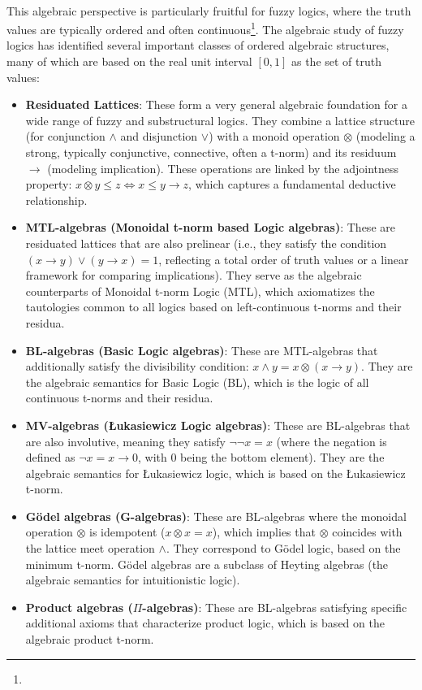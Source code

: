 \\


This algebraic perspective is particularly fruitful for fuzzy logics, where the truth values are typically ordered and often continuous\footnote{}. The algebraic study of fuzzy logics has identified several important classes of ordered algebraic structures, many of which are based on the real unit interval $[0,1]$ as the set of truth values:
\begin{itemize}
    \item \textbf{Residuated Lattices}: These form a very general algebraic foundation for a wide range of fuzzy and substructural logics. They combine a lattice structure (for conjunction $\wedge$ and disjunction $\vee$) with a monoid operation $\otimes$ (modeling a strong, typically conjunctive, connective, often a t-norm) and its residuum $\rightarrow$ (modeling implication). These operations are linked by the adjointness property: $x \otimes y \leq z \iff x \leq y \rightarrow z$, which captures a fundamental deductive relationship.
    \item \textbf{MTL-algebras (Monoidal t-norm based Logic algebras)}: These are residuated lattices that are also prelinear (i.e., they satisfy the condition $(x \rightarrow y) \vee (y \rightarrow x) = 1$, reflecting a total order of truth values or a linear framework for comparing implications). They serve as the algebraic counterparts of Monoidal t-norm Logic (MTL), which axiomatizes the tautologies common to all logics based on left-continuous t-norms and their residua.
    \item \textbf{BL-algebras (Basic Logic algebras)}: These are MTL-algebras that additionally satisfy the divisibility condition: $x \wedge y = x \otimes (x \rightarrow y)$. They are the algebraic semantics for Basic Logic (BL), which is the logic of all continuous t-norms and their residua.
    \item \textbf{MV-algebras (Łukasiewicz Logic algebras)}: These are BL-algebras that are also involutive, meaning they satisfy $\neg \neg x = x$ (where the negation is defined as $\neg x = x \rightarrow 0$, with $0$ being the bottom element). They are the algebraic semantics for Łukasiewicz logic, which is based on the Łukasiewicz t-norm.
    \item \textbf{Gödel algebras (G-algebras)}: These are BL-algebras where the monoidal operation $\otimes$ is idempotent ($x \otimes x = x$), which implies that $\otimes$ coincides with the lattice meet operation $\wedge$. They correspond to Gödel logic, based on the minimum t-norm. Gödel algebras are a subclass of Heyting algebras (the algebraic semantics for intuitionistic logic).
    \item \textbf{Product algebras ($\Pi$-algebras)}: These are BL-algebras satisfying specific additional axioms that characterize product logic, which is based on the algebraic product t-norm.
\end{itemize}
